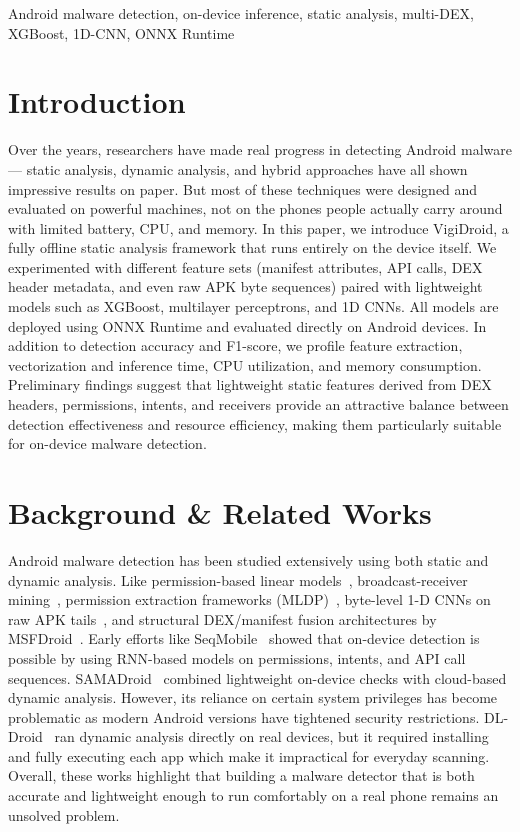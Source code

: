 \documentclass[conference]{IEEEtran}
\begin{document}
	
	
	\begin{IEEEkeywords}
		Android malware detection, on-device inference, static analysis, multi-DEX, XGBoost, 1D-CNN, ONNX Runtime
	\end{IEEEkeywords}
	
	
	\section{Introduction}
	Over the years, researchers have made real progress in detecting Android malware — static analysis, dynamic analysis, and hybrid approaches have all shown impressive results on paper.
	But most of these techniques were designed and evaluated on powerful machines, not on the phones people actually carry around with limited battery, CPU, and memory.
	In this paper, we introduce VigiDroid, a fully offline static analysis framework that runs entirely on the device itself.
	We experimented with different feature sets (manifest attributes, API calls, DEX header metadata, and even raw APK byte sequences) paired with lightweight models such as XGBoost, multilayer perceptrons, and 1D CNNs.
	All models are deployed using ONNX Runtime and evaluated directly on Android devices.
	In addition to detection accuracy and F1-score, we profile feature extraction, vectorization and inference time, CPU utilization, and memory consumption.
	Preliminary findings suggest that lightweight static features derived from DEX headers, permissions, intents, and receivers provide an attractive balance between detection effectiveness and resource efficiency, making them particularly suitable for on-device malware detection.
	\section{Background \& Related Works}
	Android malware detection has been studied extensively using both static and dynamic analysis.
	Like permission-based linear models~\cite{linregdroid}, broadcast-receiver mining~\cite{broadcast}, permission extraction frameworks (MLDP)~\cite{mldp}, byte-level 1-D CNNs on raw APK tails~\cite{bytecnn}, and structural DEX/manifest fusion architectures by MSFDroid~\cite{msfdroid}.
	Early efforts like SeqMobile ~\cite{seqmobile}showed that on-device detection is possible by using RNN-based models on permissions, intents, and API call sequences.
	SAMADroid~\cite{samadroid} combined lightweight on-device checks with cloud-based dynamic analysis. However, its reliance on certain system privileges has become problematic as modern Android versions have tightened security restrictions.
	DL-Droid~\cite{dldroid} ran dynamic analysis directly on real devices, but it required installing and fully executing each app which make it impractical for everyday scanning.
	Overall, these works highlight that building a malware detector that is both accurate and lightweight enough to run comfortably on a real phone remains an unsolved problem.
\end{document}
